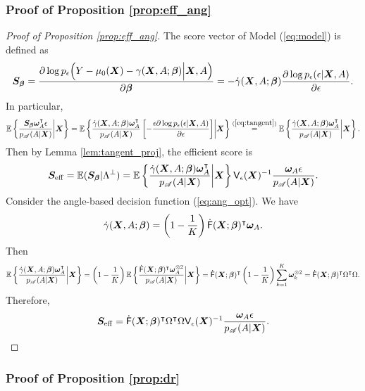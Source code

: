 \documentclass[11pt]{article}
\numberwithin{equation}{section}
\theoremstyle{definition}
\theoremstyle{remark}
\newcommand{\bS}{\bm{S}}
\newcommand{\bX}{\bm{X}}
\newcommand{\bbeta}{\bm{\beta}}
\newcommand{\bomega}{\bm{\omega}}
\newcommand{\bbE}{\mathbb{E}}
\newcommand{\sA}{\mathscr{A}}
\newcommand{\sfF}{\mathsf{F}}
\newcommand{\sfV}{\mathsf{V}}
\newcommand{\eff}{\mathrm{eff}}
\begin{document}
\subsubsection{Proof of Proposition \ref{prop:eff_ang}}

\begin{proof}[Proof of Proposition \ref{prop:eff_ang}]
	The score vector of Model (\ref{eq:model}) is defined as \citep{tsiatis2007semiparametric}
	\[ \bS_{\bbeta} = {\partial\log p_{\epsilon}\Big( Y - \mu_{0}(\bX) - \gamma(\bX,A;\bbeta)\Big|\bX,A\Big) \over \partial\bbeta} = -\dot{\gamma}(\bX,A;\bbeta){\partial \log p_{\epsilon}(\epsilon|\bX,A) \over \partial\epsilon}. \]
	In particular,
	\[ \bbE\left\{ {\bS_{\bbeta}\bomega_{A}^{\intercal}\epsilon\over p_{\sA}(A|\bX)}\middle|\bX \right\} = \bbE\left\{ {\dot{\gamma}(\bX,A;\bbeta)\bomega_{A}^{\intercal}\over p_{\sA}(A|\bX)} \left[ - {\epsilon\partial\log p_{\epsilon}(\epsilon|\bX,A) \over \partial\epsilon} \right] \middle|\bX \right\} \stackrel{(\ref{eq:tangent})}{=} \bbE\left\{ {\dot{\gamma}(\bX,A;\bbeta)\bomega_{A}^{\intercal}\over p_{\sA}(A|\bX)} \middle|\bX \right\}. \]
	Then by Lemma \ref{lem:tangent_proj}, the efficient score \citep{tsiatis2007semiparametric} is 
	\[ \bS_{\eff} = \bbE(\bS_{\bbeta}|\Lambda^{\perp}) = \bbE\left\{ {\dot{\gamma}(\bX,A;\bbeta)\bomega_{A}^{\intercal}\over p_{\sA}(A|\bX)} \middle|\bX \right\}\sfV_{\epsilon}(\bX)^{-1}{\bomega_{A}\epsilon \over p_{\sA}(A|\bX)}. \]
	Consider the angle-based decision function (\ref{eq:ang_opt}). We have
	\[ \dot{\gamma}(\bX,A;\bbeta) = \left( 1 - {1 \over K} \right)\dot{\sfF}(\bX;\bbeta)^{\intercal}\bomega_{A}. \]
	Then
	\[ \bbE\left\{ {\dot{\gamma}(\bX,A;\bbeta)\bomega_{A}^{\intercal}\over p_{\sA}(A|\bX)} \middle|\bX \right\} = \left( 1 - {1 \over K} \right)\bbE\left\{ {\dot{\sfF}(\bX;\bbeta)^{\intercal}\bomega_{A}^{\otimes 2} \over p_{\sA}(A|\bX)}\middle|\bX \right\} = \dot{\sfF}(\bX;\bbeta)^{\intercal}\left( 1 - {1 \over K} \right)\sum_{k=1}^{K}\bomega_{k}^{\otimes 2} = \dot{\sfF}(\bX;\bbeta)^{\intercal}\Omega^{\intercal}\Omega. \]
	Therefore,
	\[ \bS_{\eff} = \dot{\sfF}(\bX;\bbeta)^{\intercal}\Omega^{\intercal}\Omega\sfV_{\epsilon}(\bX)^{-1}{\bomega_{A}\epsilon \over p_{\sA}(A|\bX)}. \]
\end{proof}

\subsubsection{Proof of Proposition \ref{prop:dr}}
\end{document}
